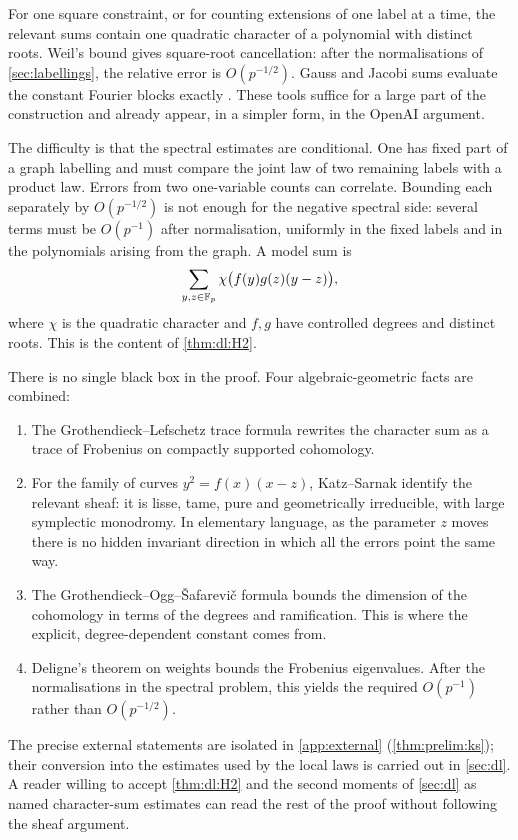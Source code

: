 For one square constraint, or for counting extensions of one label at a
time, the relevant sums contain one quadratic character of a polynomial
with distinct roots. Weil's bound \cite{Weil48,Weil49,Schmidt76} gives
square-root cancellation: after the normalisations of
\cref{sec:labellings}, the
relative error is $O(p^{-1/2})$. Gauss and Jacobi sums evaluate the
constant Fourier blocks exactly \cite{BerndtEvansWilliams,IrelandRosen}.
These tools suffice for a large part of the construction and already
appear, in a simpler form, in the OpenAI argument.

The difficulty is that the spectral estimates are conditional. One has
fixed part of a graph labelling and must compare the joint law of two
remaining labels with a product law. Errors from two one-variable counts
can correlate. Bounding each separately by $O(p^{-1/2})$ is not enough
for the negative spectral side: several terms must be $O(p^{-1})$ after
normalisation, uniformly in the fixed labels and in the polynomials
arising from the graph. A model sum is
\[
  \sum_{y,z\in\mathbb F_p}\chi\bigl(f(y)g(z)(y-z)\bigr),
\]
where $\chi$ is the quadratic character and $f,g$ have controlled
degrees and distinct roots. This is the content of \cref{thm:dl:H2}.

There is no single black box in the proof.
Four algebraic-geometric facts are combined:
\begin{enumerate}[label=(\roman*)]
\item The Grothendieck--Lefschetz trace formula rewrites the character
sum as a trace of Frobenius on compactly supported cohomology.
\item For the family of curves $y^2=f(x)(x-z)$, Katz--Sarnak
\cite{KatzSarnak} identify the relevant sheaf: it is lisse, tame, pure and
geometrically irreducible, with large symplectic monodromy. In elementary
language, as the parameter $z$ moves there is no hidden invariant
direction in which all the errors point the same way.
\item The Grothendieck--Ogg--\v Safarevi\v c formula bounds the
dimension of the cohomology in terms of the degrees and ramification.
This is where the explicit, degree-dependent constant comes from.
\item Deligne's theorem on weights \cite{DeligneWeilI,DeligneWeilII}
bounds the Frobenius eigenvalues. After the normalisations in the
spectral problem, this yields the required $O(p^{-1})$ rather than
$O(p^{-1/2})$.
\end{enumerate}
The precise external statements are isolated in \cref{app:external}
(\cref{thm:prelim:ks}); their conversion into the estimates used by the
local laws is carried out in \cref{sec:dl}. A reader willing to accept
\cref{thm:dl:H2} and the second moments of \cref{sec:dl} as named
character-sum estimates can read the rest of the proof without following
the sheaf argument.

